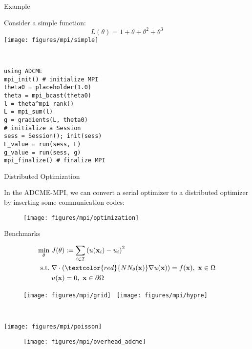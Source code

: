 \documentclass[usenames,dvipsnames]{beamer}
\newcommand{\bx}{\mathbf{x}}
\begin{document}
\begin{frame}[fragile]{Example}

\begin{minipage}{.5\textwidth}
	Consider a simple function:
	$$L(\theta) = 1 + \theta + \theta^2 + \theta^3$$
		\texttt{[image: figures/mpi/simple]}
\end{minipage}~
\begin{minipage}{.5\textwidth}
	\begin{verbatim}
using ADCME
mpi_init() # initialize MPI 
theta0 = placeholder(1.0)
theta = mpi_bcast(theta0)
l = theta^mpi_rank()
L = mpi_sum(l)
g = gradients(L, theta0)
# initialize a Session
sess = Session(); init(sess)
L_value = run(sess, L) 
g_value = run(sess, g)
mpi_finalize() # finalize MPI 
	\end{verbatim}
\end{minipage}


\end{frame}


\begin{frame}{Distributed Optimization}
	
	In the ADCME-MPI, we can convert a serial optimizer to a distributed optimizer by inserting some communication codes:
\begin{figure}
\centering 
\texttt{[image: figures/mpi/optimization]}
\end{figure}
\end{frame}

\begin{frame}{Benchmarks}
	\begin{minipage}[c]{.52\textwidth}
		\begin{equation*}
			\begin{aligned}
				\min_{\theta}&\; J(\theta):=\sum_{i\in \mathcal{I}} \left( u(\bx_i) - u_i \right)^2\\ 
				\text{s.t.} &\; \nabla \cdot (\textcolor{red}{NN_\theta(\bx)} \nabla u(\bx))  = f(\bx),\ \bx \in \Omega \\ 
				&\; u(\bx) = 0,\  \bx \in \partial \Omega
			\end{aligned}
		\end{equation*}
	\begin{figure}
		\centering
			\texttt{[image: figures/mpi/grid]}~
				\texttt{[image: figures/mpi/hypre]}
	\end{figure}

	\end{minipage}~
	\begin{minipage}[c]{.48\textwidth}
		\texttt{[image: figures/mpi/poisson]}
	\end{minipage}
	
	
\end{frame}
\begin{frame}
	\begin{figure}[htpb]
		\centering 		
		\texttt{[image: figures/mpi/overhead\_adcme]}
	\end{figure}
\end{frame}
\end{document}
